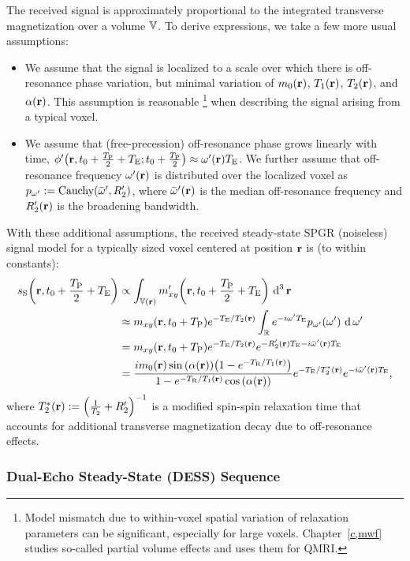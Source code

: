 The received signal
is approximately proportional 
to the integrated transverse magnetization
over a volume $\mathbb{V}$.
To derive expressions,
we take a few more usual assumptions:
\begin{itemize}
	\item We assume that
	the signal is localized
	to a scale over which
	there is off-resonance phase variation,
	but minimal variation
	of $\mzero\pr$, $\To\pr$, $\Tt\pr$, and $\flip\pr$.
	This assumption is reasonable
	\footnote{Model mismatch due
		to within-voxel spatial variation 
		of relaxation parameters
		can be significant,
		especially for large voxels.
		Chapter~\ref{c,mwf} studies 
		so-called partial volume effects
		and uses them for QMRI.
	} 
	when describing the signal 
	arising from a typical voxel.
	\item We assume that
	(free-precession) off-resonance phase 
	grows linearly with time,
	\ie $\php\paren{\bmr,t_0+\frac{\TP}{2}+\TE;t_0+\frac{\TP}{2}} \approx \omp\pr \TE$.
	We further assume
	that off-resonance frequency $\omp\pr$
	is distributed over the localized voxel
	as $\dist{\omp} := \operatorname{Cauchy}\paren{\ompmed,\Rtp}$,
	where $\ompmed\pr$ is the median off-resonance frequency
	and $\Rtp\pr$ is the broadening bandwidth.
\end{itemize}
With these additional assumptions,
the received steady-state SPGR (noiseless) signal model
for a typically sized voxel
centered at position $\mathbf{r}$ is (to within constants):
\begin{align}
	\spgr\paren{\bmr,t_0+\frac{\TP}{2}+\TE} 
	&\propto \int_{\setV\pr} \mxyp\paren{\bmr,t_0+\frac{\TP}{2}+\TE} \dercubed{\bmr} 
		\label{eq:spgr-int} \\
	&\approx \mxy\paren{\bmr,t_0+\TP} e^{-\TE/\Tt\pr} \int_\real e^{-i\omp \TE} 
		\dist{\omp}\paren{\omp} \der{\omp} \nonumber \\
	&= \mxy\paren{\bmr,t_0+\TP} e^{-\TE/\Tt\pr} e^{-\Rtp\pr\TE - i\ompmed\pr\TE} \nonumber \\
	&= \frac{i\mzero\pr \sina{\flip\pr} \paren{1-e^{-\TR/\To\pr}}}
	{1-e^{-\TR/\To\pr}\cosa{\alpha\pr}} e^{-\TE/\Tts\pr} e^{-i\ompmed\pr \TE},
		\label{eq:spgr-model}
\end{align}
where $\Tts\pr := \inv{\frac{1}{\Tt} + \Rtp}$
is a modified spin-spin relaxation time
that accounts for additional transverse magnetization decay
due to off-resonance effects.

\subsubsection{Dual-Echo Steady-State (DESS) Sequence}
\label{sss,bkgrd,mri,ss,dess}

